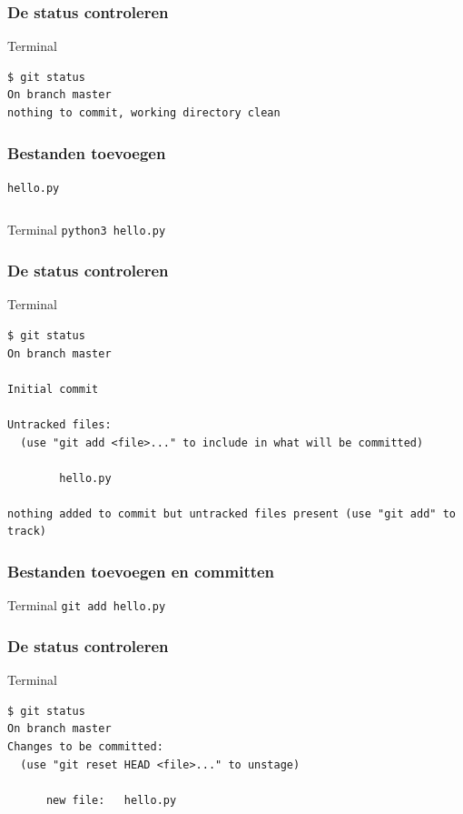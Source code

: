 \documentclass[]{beamer}
\begin{document}
\begin{frame}[fragile]
    \frametitle{De status controleren}

    \begin{block}{Terminal}
\begin{verbatim}
$ git status
On branch master
nothing to commit, working directory clean
\end{verbatim}
    \end{block}
\end{frame}

\begin{frame}[fragile]
    \frametitle{Bestanden toevoegen}

    \texttt{hello.py}
    \inputminted[bgcolor=monokaibg]{python}{source/hello.py}

    \vspace{10 mm}

    \begin{block}{Terminal}
    \verb/python3 hello.py/
    \end{block}
\end{frame}

\begin{frame}[fragile]
    \frametitle{De status controleren}

    \begin{block}{Terminal}
\begin{Verbatim}[fontsize=\tiny]
$ git status
On branch master

Initial commit

Untracked files:
  (use "git add <file>..." to include in what will be committed)

        hello.py

nothing added to commit but untracked files present (use "git add" to track)
\end{Verbatim}
    \end{block}
\end{frame}

\begin{frame}[fragile]
    \frametitle{Bestanden toevoegen en committen}

    \begin{block}{Terminal}
    \verb/git add hello.py/
    \end{block}
\end{frame}

\begin{frame}[fragile]
    \frametitle{De status controleren}

    \begin{block}{Terminal}
\begin{Verbatim}[fontsize=\scriptsize]
$ git status
On branch master
Changes to be committed:
  (use "git reset HEAD <file>..." to unstage)

      new file:   hello.py
\end{Verbatim}
    \end{block}
\end{frame}
\end{document}

